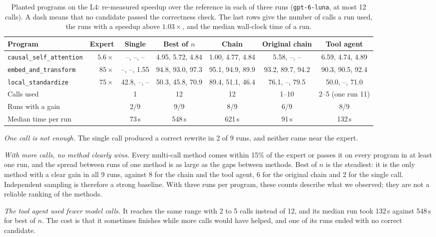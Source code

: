 \documentclass[conference]{IEEEtran}
\begin{document}
\begin{table}[t]
  \centering
  \caption{Planted programs on the L4: re-measured speedup over the reference
  in each of three runs (\texttt{gpt-6-luna}, at most 12 calls). A dash means
  that no candidate passed the correctness check. The last rows give the
  number of calls a run used, the runs with a speedup above $1.03\times$,
  and the median wall-clock time of a run.}
  \label{tab:planted}
  \begin{tabular}{@{}lrccccc@{}}
    \toprule
    Program & Expert & Single & Best of $n$ & Chain & Original chain & Tool agent \\
    \midrule
    \texttt{causal\_self\_attention} & $5.6\times$ & --, --, -- & 4.95, 5.72, 4.84 & 1.00, 4.77, 4.84 & 5.58, --, -- & 6.59, 4.74, 4.89 \\
    \texttt{embed\_and\_transform} & $85\times$ & --, --, 1.55 & 94.8, 93.0, 97.3 & 95.1, 94.9, 89.9 & 93.2, 89.7, 94.2 & 90.3, 90.5, 92.4 \\
    \texttt{local\_standardize} & $75\times$ & 42.8, --, -- & 50.3, 45.8, 70.9 & 89.4, 51.1, 46.4 & 76.1, --, 79.5 & 50.0, --, 71.0 \\
    \midrule
    Calls used & & 1 & 12 & 12 & 1--10 & 2--5 (one run 11) \\
    Runs with a gain & & 2/9 & 9/9 & 8/9 & 6/9 & 8/9 \\
    Median time per run & & 73\,s & 548\,s & 621\,s & 91\,s & 132\,s \\
    \bottomrule
  \end{tabular}
\end{table}

\emph{One call is not enough.} The single call produced a correct rewrite in
2 of 9 runs, and neither came near the expert.

\emph{With more calls, no method clearly wins.} Every multi-call method
comes within 15\% of the expert or passes it on every program in at least
one run, and the
spread between runs of one method is as large as the gaps between methods.
Best of $n$ is the steadiest: it is the only method with a clear gain in all
9 runs, against 8 for the chain and the tool agent, 6 for the original chain
and 2 for the single call. Independent sampling is therefore a strong
baseline. With three runs per program, these counts describe what we
observed; they are not a reliable ranking of the methods.

\emph{The tool agent used fewer model calls.} It reaches the same range with
2 to 5 calls instead of 12, and its median run took 132\,s against 548\,s
for best of $n$. The cost is that it sometimes finishes while more calls would
have helped, and one of its runs ended with no correct candidate.
\end{document}
